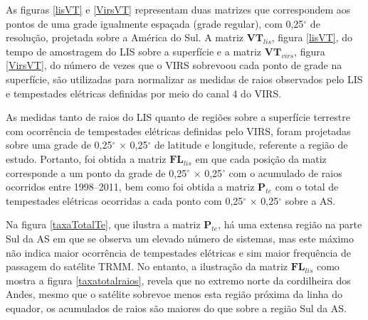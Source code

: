 As figuras  \ref{lisVT} e \ref{VirsVT} representam duas matrizes que correspondem aos pontos de uma grade igualmente espaçada (grade regular), com 0,25$^{\circ}$ de resolução, projetada sobre a América do Sul. A matriz $\mathbf{VT}_{lis}$, figura \ref{lisVT}, do tempo de amostragem do LIS sobre a superfície e a matriz $\mathbf{VT}_{virs}$, figura \ref{VirsVT}, do número de vezes que o VIRS sobrevoou cada ponto de grade na superfície, são utilizadas para normalizar as medidas de raios observados pelo LIS e tempestades elétricas definidas por meio do canal 4 do VIRS.  


As medidas tanto de raios do LIS quanto de regiões sobre a superfície terrestre com ocorrência de tempestades elétricas definidas pelo VIRS, foram projetadas sobre uma grade de  0,25$^{\circ}$ $\times$ 0,25$^{\circ}$ de latitude e longitude, referente a região de estudo. Portanto, foi obtida a matriz $\mathbf{FL}_{lis}$ em que cada posição da matiz corresponde a um ponto da grade de 0,25$^{\circ}$ $\times$ 0,25$^{\circ}$ com o acumulado de raios ocorridos entre 1998--2011, bem como foi obtida a matriz $\mathbf{P}_{te}$ com o total de tempestades elétricas ocorridas a cada ponto com 0,25$^{\circ}$ $\times$ 0,25$^{\circ}$ sobre a AS.




Na figura \ref{taxaTotalTe}, que ilustra a matriz $\mathbf{P}_{te}$, há uma extensa região na parte Sul da AS em que se observa um elevado número de sistemas, mas este máximo não indica maior ocorrência de tempestades elétricas e sim maior frequência de passagem do satélite TRMM. No entanto, a ilustração da matriz $\mathbf{FL}_{lis}$ como mostra a figura \ref{taxatotalraios}, revela que no extremo norte da cordilheira dos Andes, mesmo que o satélite sobrevoe menos esta região próxima da linha do equador, os acumulados de raios são maiores do que sobre a região Sul da AS. 


